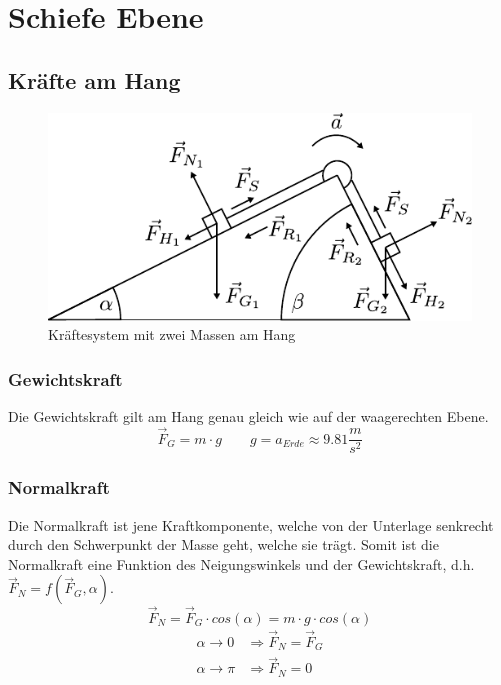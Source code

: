 \chapter{Schiefe Ebene}

\newpage
\section{Kräfte am Hang}
\begin{figure}[h!]
	\centering
	\includegraphics[scale=1]{schiefe-ebene-1.pdf}
	\caption{Kräftesystem mit zwei Massen am Hang}
	\label{fig:hangsystem}
\end{figure}

\subsection{Gewichtskraft}
Die Gewichtskraft gilt am Hang genau gleich wie auf der waagerechten Ebene.
\[ \boxed{\vec{F}_G = m \cdot g} \qquad g = a_{Erde} \approx 9.81\frac{m}{s^2} \]

\subsection{Normalkraft}
Die Normalkraft ist jene Kraftkomponente, welche von der Unterlage senkrecht
durch den Schwerpunkt der Masse geht, welche sie trägt. Somit ist die 
Normalkraft eine Funktion des Neigungswinkels und der Gewichtskraft, d.h.
$\vec{F}_N = f(\vec{F}_G, \alpha)$.
\[ \boxed{ \vec{F}_N = \vec{F}_G \cdot cos(\alpha) = m \cdot g \cdot cos(\alpha)} \]
\[ \begin{array}{ll}
	\alpha \rightarrow 0 & \Rightarrow \vec{F}_N = \vec{F}_G \\
	\alpha \rightarrow \pi & \Rightarrow \vec{F}_N = 0
\end{array} \]

